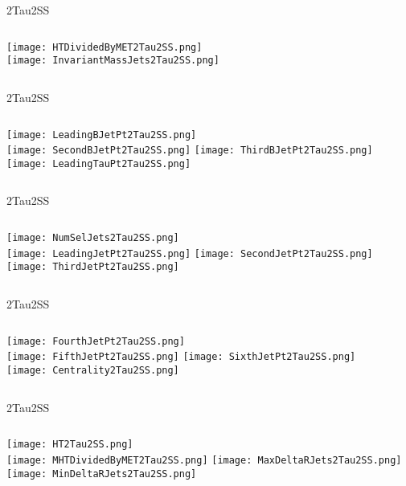 \documentclass{beamer}
\begin{document}
\begin{frame}{2Tau2SS}
    \begin{columns}[t]
    \centering
    \texttt{[image: HTDividedByMET2Tau2SS.png]}\\
    \centering
    \texttt{[image: InvariantMassJets2Tau2SS.png]}
    \end{columns}
\end{frame}
\begin{frame}{2Tau2SS}
    \begin{columns}[t]
    \centering
    \texttt{[image: LeadingBJetPt2Tau2SS.png]}\\
    \texttt{[image: SecondBJetPt2Tau2SS.png]}
    \centering
    \texttt{[image: ThirdBJetPt2Tau2SS.png]}\\
    \texttt{[image: LeadingTauPt2Tau2SS.png]}
    \end{columns}
\end{frame}
\begin{frame}{2Tau2SS}
    \begin{columns}[t]
    \centering
    \texttt{[image: NumSelJets2Tau2SS.png]}\\
    \texttt{[image: LeadingJetPt2Tau2SS.png]}
    \centering
    \texttt{[image: SecondJetPt2Tau2SS.png]}\\
    \texttt{[image: ThirdJetPt2Tau2SS.png]}
    \end{columns}
\end{frame}
\begin{frame}{2Tau2SS}
    \begin{columns}[t]
    \centering
    \texttt{[image: FourthJetPt2Tau2SS.png]}\\
    \texttt{[image: FifthJetPt2Tau2SS.png]}
    \centering
    \texttt{[image: SixthJetPt2Tau2SS.png]}\\
    \texttt{[image: Centrality2Tau2SS.png]}
    \end{columns}
\end{frame}
\begin{frame}{2Tau2SS}
    \begin{columns}[t]
    \centering
    \texttt{[image: HT2Tau2SS.png]}\\
    \texttt{[image: MHTDividedByMET2Tau2SS.png]}
    \centering
    \texttt{[image: MaxDeltaRJets2Tau2SS.png]}\\
    \texttt{[image: MinDeltaRJets2Tau2SS.png]}
    \end{columns}
\end{frame}
\end{document}

